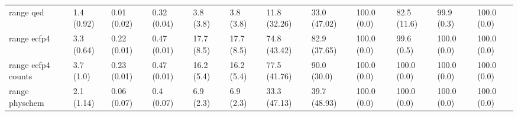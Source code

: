 \begin{tabular}{llllllllllll}
range qed & {\cellcolor[HTML]{F2FAFC}} \color[HTML]{000000} 1.4 (0.92) & {\cellcolor[HTML]{F7FCFD}} \color[HTML]{000000} 0.01 (0.02) & {\cellcolor[HTML]{B2E2D7}} \color[HTML]{000000} 0.32 (0.04) & {\cellcolor[HTML]{F2FAFC}} \color[HTML]{000000} 3.8 (3.8) & {\cellcolor[HTML]{F2FAFC}} \color[HTML]{000000} 3.8 (3.8) & {\cellcolor[HTML]{E6F5F9}} \color[HTML]{000000} 11.8 (32.26) & {\cellcolor[HTML]{ACDFD4}} \color[HTML]{000000} 33.0 (47.02) & {\cellcolor[HTML]{00441B}} \color[HTML]{F1F1F1} 100.0 (0.0) & {\cellcolor[HTML]{0D7836}} \color[HTML]{F1F1F1} 82.5 (11.6) & {\cellcolor[HTML]{00441B}} \color[HTML]{F1F1F1} 99.9 (0.3) & {\cellcolor[HTML]{00441B}} \color[HTML]{F1F1F1} 100.0 (0.0) \\
range ecfp4 & {\cellcolor[HTML]{F2FAFC}} \color[HTML]{000000} 3.3 (0.64) & {\cellcolor[HTML]{F7FCFD}} \color[HTML]{000000} 0.22 (0.01) & {\cellcolor[HTML]{72C7AD}} \color[HTML]{000000} 0.47 (0.01) & {\cellcolor[HTML]{DBF1F1}} \color[HTML]{000000} 17.7 (8.5) & {\cellcolor[HTML]{DBF1F1}} \color[HTML]{000000} 17.7 (8.5) & {\cellcolor[HTML]{238B45}} \color[HTML]{F1F1F1} 74.8 (43.42) & {\cellcolor[HTML]{0C7735}} \color[HTML]{F1F1F1} 82.9 (37.65) & {\cellcolor[HTML]{00441B}} \color[HTML]{F1F1F1} 100.0 (0.0) & {\cellcolor[HTML]{00451C}} \color[HTML]{F1F1F1} 99.6 (0.5) & {\cellcolor[HTML]{00441B}} \color[HTML]{F1F1F1} 100.0 (0.0) & {\cellcolor[HTML]{00441B}} \color[HTML]{F1F1F1} 100.0 (0.0) \\
range ecfp4 counts & {\cellcolor[HTML]{F4FBFC}} \color[HTML]{000000} 3.7 (1.0) & {\cellcolor[HTML]{F7FCFD}} \color[HTML]{000000} 0.23 (0.01) & {\cellcolor[HTML]{72C7AD}} \color[HTML]{000000} 0.47 (0.01) & {\cellcolor[HTML]{DEF2F4}} \color[HTML]{000000} 16.2 (5.4) & {\cellcolor[HTML]{DEF2F4}} \color[HTML]{000000} 16.2 (5.4) & {\cellcolor[HTML]{1C8540}} \color[HTML]{F1F1F1} 77.5 (41.76) & {\cellcolor[HTML]{006428}} \color[HTML]{F1F1F1} 90.0 (30.0) & {\cellcolor[HTML]{00441B}} \color[HTML]{F1F1F1} 100.0 (0.0) & {\cellcolor[HTML]{00441B}} \color[HTML]{F1F1F1} 100.0 (0.0) & {\cellcolor[HTML]{00441B}} \color[HTML]{F1F1F1} 100.0 (0.0) & {\cellcolor[HTML]{00441B}} \color[HTML]{F1F1F1} 100.0 (0.0) \\
range physchem & {\cellcolor[HTML]{F5FBFD}} \color[HTML]{000000} 2.1 (1.14) & {\cellcolor[HTML]{F7FCFD}} \color[HTML]{000000} 0.06 (0.07) & {\cellcolor[HTML]{8FD4C2}} \color[HTML]{000000} 0.4 (0.07) & {\cellcolor[HTML]{EDF8FB}} \color[HTML]{000000} 6.9 (2.3) & {\cellcolor[HTML]{EDF8FB}} \color[HTML]{000000} 6.9 (2.3) & {\cellcolor[HTML]{AADFD3}} \color[HTML]{000000} 33.3 (47.13) & {\cellcolor[HTML]{90D4C3}} \color[HTML]{000000} 39.7 (48.93) & {\cellcolor[HTML]{00441B}} \color[HTML]{F1F1F1} 100.0 (0.0) & {\cellcolor[HTML]{00441B}} \color[HTML]{F1F1F1} 100.0 (0.0) & {\cellcolor[HTML]{00441B}} \color[HTML]{F1F1F1} 100.0 (0.0) & {\cellcolor[HTML]{00441B}} \color[HTML]{F1F1F1} 100.0 (0.0) \\

\end{tabular}

